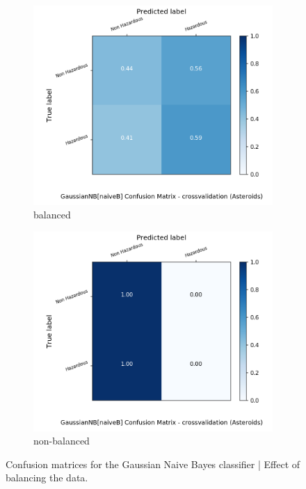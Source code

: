 \documentclass{article}
\begin{document}
\begin{figure}[H]
	\centering
	\begin{subfigure}{.5\textwidth}
		\centering
		\includegraphics[width=1.1\textwidth]{Plots/asteroids/asteroids_GaussianNB_naiveB_balance_True_crossvalidation.png}
		\caption{balanced}
	\end{subfigure}%
	\begin{subfigure}{.5\textwidth}
		\centering
		\includegraphics[width=1.1\textwidth]{Plots/asteroids/asteroids_GaussianNB_naiveB_balance_False_crossvalidation.png}
		\caption{non-balanced}
	\end{subfigure}
	\caption{Confusion matrices for the Gaussian Naive Bayes classifier | Effect of balancing the data.}
	\label{fig:conf_matr_asteroids_bal_vs_nonbal}
\end{figure}
\end{document}
